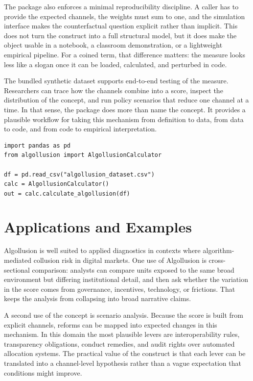 \documentclass[12pt]{article}
\begin{document}
The package also enforces a minimal reproducibility discipline. A caller has to provide the expected channels, the weights must sum to one, and the simulation interface makes the counterfactual question explicit rather than implicit. This does not turn the construct into a full structural model, but it does make the object usable in a notebook, a classroom demonstration, or a lightweight empirical pipeline. For a coined term, that difference matters: the measure looks less like a slogan once it can be loaded, calculated, and perturbed in code.

The bundled synthetic dataset supports end-to-end testing of the measure. Researchers can trace how the channels combine into a score, inspect the distribution of the concept, and run policy scenarios that reduce one channel at a time. In that sense, the package does more than name the concept. It provides a plausible workflow for taking this mechanism from definition to data, from data to code, and from code to empirical interpretation.

\begin{verbatim}
import pandas as pd
from algollusion import AlgollusionCalculator

df = pd.read_csv("algollusion_dataset.csv")
calc = AlgollusionCalculator()
out = calc.calculate_algollusion(df)
\end{verbatim}

\section{Applications and Examples}
Algollusion is well suited to applied diagnostics in contexts where algorithm-mediated collusion risk in digital markets. One use of Algollusion is cross-sectional comparison: analysts can compare units exposed to the same broad environment but differing institutional detail, and then ask whether the variation in the score comes from governance, incentives, technology, or frictions. That keeps the analysis from collapsing into broad narrative claims.

A second use of the concept is scenario analysis. Because the score is built from explicit channels, reforms can be mapped into expected changes in this mechanism. In this domain the most plausible levers are interoperability rules, transparency obligations, conduct remedies, and audit rights over automated allocation systems. The practical value of the construct is that each lever can be translated into a channel-level hypothesis rather than a vague expectation that conditions might improve.
\end{document}

